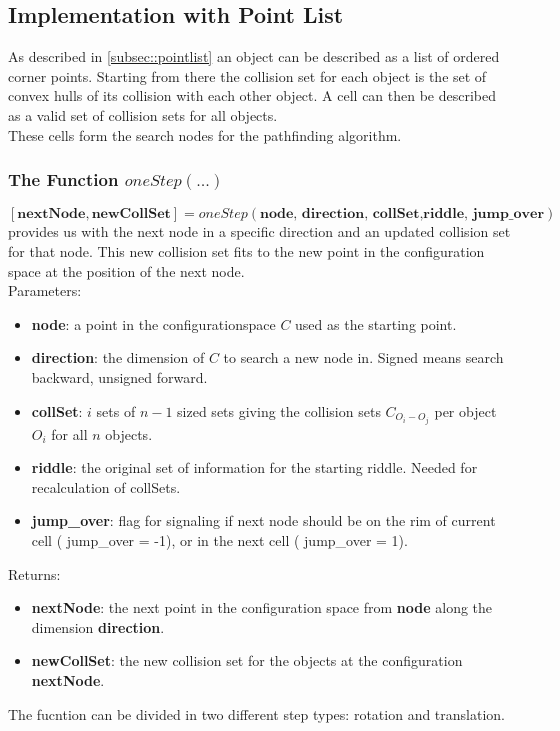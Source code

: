 \subsection{Implementation with Point List}
As described in \ref{subsec::pointlist} an object can be described as a list of ordered corner points. Starting from there the collision set for each object is the set of convex hulls of its collision with each other object. A cell can then be described as a valid set of collision sets for all objects.\\
These cells form the search nodes for the pathfinding algorithm.
\subsubsection{The Function $oneStep(...)$}
$[\textbf{nextNode}, \textbf{newCollSet} ]=oneStep(\textbf{node, direction, collSet,riddle, jump\_over})$  provides us with the next node in a specific direction and an updated collision set for that node. This new collision set fits to the new point in the configuration space at the position of the next node.\\
Parameters:
\begin{itemize}
\item \textbf{node}: a point in the configurationspace $C$ used as the starting point.
\item \textbf{direction}: the dimension of $C$ to search a new node in. Signed means search backward, unsigned forward. 
\item \textbf{collSet}: $i$ sets of $n-1$ sized sets giving the collision sets $C_{O_i-O_j}$ per object $O_i$ for all $n$ objects.
\item \textbf{riddle}: the original set of information for the starting riddle. Needed for recalculation of collSets.
\item \textbf{jump\_over}: flag for signaling if next node should be on the rim of current cell ( jump\_over = -1), or in the next cell ( jump\_over = 1).
\end{itemize}
Returns:
\begin{itemize}
\item \textbf{nextNode}: the next point in the configuration space from \textbf{node} along the dimension \textbf{direction}.
\item \textbf{newCollSet}: the new collision set for the objects at the configuration \textbf{nextNode}.
\end{itemize}
The fucntion can be divided in two different step types: rotation and translation. \\
